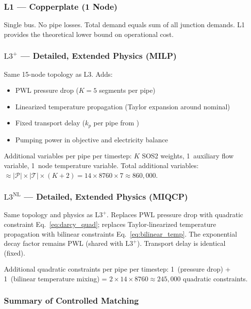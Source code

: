 \documentclass[review,3p]{elsarticle}
\newcommand{\Lplus}{\mathrm{L3}^{+}}
\newcommand{\Lnl}{\mathrm{L3}^{\mathrm{NL}}}
\begin{document}
\subsubsection{L1 --- Copperplate (1 Node)}

Single bus. No pipe losses. Total demand equals sum of all junction
demands. L1 provides the theoretical lower bound on operational
cost.

\subsubsection{$\Lplus$ --- Detailed, Extended Physics (MILP)}

Same 15-node topology as L3. Adds:
\begin{itemize}[nosep]
    \item PWL pressure drop ($K=5$ segments per pipe)
    \item Linearized temperature propagation
    (Taylor expansion around nominal)
    \item Fixed transport delay ($k_p$ per pipe from
    )
    \item Pumping power in objective and electricity balance
\end{itemize}

Additional variables per pipe per timestep: $K$ SOS2 weights,
1~auxiliary flow variable, 1~node temperature variable. Total
additional variables: $\approx |\mathcal{P}| \times |\mathcal{T}|
\times (K+2) = 14 \times 8760 \times 7 \approx 860{,}000$.

\subsubsection{$\Lnl$ --- Detailed, Extended Physics (MIQCP)}

Same topology and physics as $\Lplus$. Replaces PWL pressure drop
with quadratic constraint Eq.~\eqref{eq:darcy_quad}; replaces
Taylor-linearized temperature propagation with bilinear constraints
Eq.~\eqref{eq:bilinear_temp}. The exponential decay factor remains
PWL (shared with $\Lplus$). Transport delay is identical (fixed).

Additional quadratic constraints per pipe per timestep: 1~(pressure
drop) + 1~(bilinear temperature mixing) = $2 \times 14 \times 8760
\approx 245{,}000$ quadratic constraints.

\subsubsection{Summary of Controlled Matching}
\end{document}
